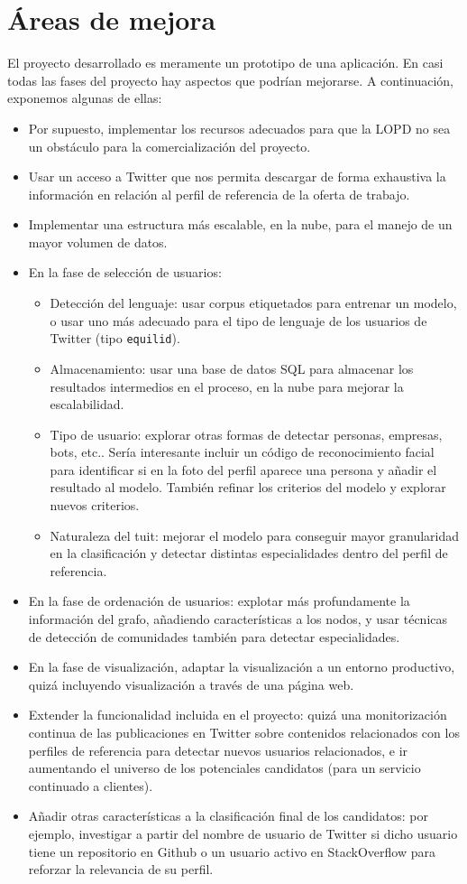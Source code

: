 \chapter{\'Areas de mejora}

El proyecto desarrollado es meramente un prototipo de una aplicación.
En casi todas las fases del proyecto hay aspectos que podrían
mejorarse. A continuación, exponemos algunas de ellas:
\begin{itemize} 
\item Por supuesto, implementar los recursos adecuados para que la 
LOPD no sea un obstáculo para la comercialización del proyecto.
\item Usar un acceso a Twitter que nos permita descargar de forma exhaustiva
la información en relación al perfil de referencia de la oferta de trabajo.
\item Implementar una estructura más escalable, en la nube,
para el manejo de un mayor volumen de datos.
\item En la fase de selección de usuarios:
\begin{itemize}
\item Detección del lenguaje: usar corpus etiquetados para entrenar un modelo,
o usar uno más adecuado para el tipo de lenguaje de los usuarios de Twitter 
(tipo {\tt equilid}).
\item Almacenamiento: usar una base de datos SQL para almacenar los resultados 
intermedios en el proceso, en la nube para mejorar la escalabilidad.
\item Tipo de usuario: explorar otras formas de detectar personas, empresas, bots, etc.. 
Sería interesante incluir un código de reconocimiento facial para identificar si en la foto 
del perfil aparece una persona y añadir el resultado al modelo. También refinar los 
criterios del modelo y explorar nuevos criterios.
\item Naturaleza del tuit: mejorar el modelo para conseguir mayor granularidad en
la clasificación y detectar distintas especialidades dentro del perfil de referencia.
\end{itemize} 
\item En la fase de ordenación de usuarios: explotar más profundamente la información
del grafo, añadiendo características a los nodos, y usar técnicas de detección de comunidades
también para detectar especialidades.
\item En la fase de visualización, adaptar la visualización a un entorno productivo,
quizá incluyendo visualización a través de una página web.
\item Extender la funcionalidad incluida en el proyecto: quizá una monitorización
continua de las publicaciones en Twitter sobre contenidos relacionados con los perfiles de 
referencia para detectar nuevos usuarios relacionados, e ir aumentando el universo de los 
potenciales candidatos (para un servicio continuado a clientes).
\item Añadir otras características a la clasificación final de los candidatos: por ejemplo,
investigar a partir del nombre de usuario de Twitter si dicho usuario tiene un repositorio en 
Github o un usuario activo en StackOverflow para reforzar la relevancia de su perfil.
\end{itemize} 